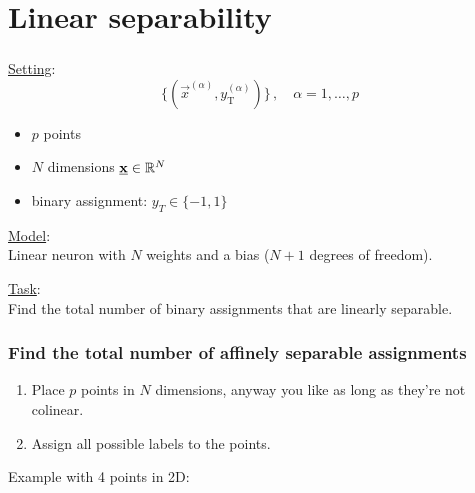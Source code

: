 \section{Linear separability}


\begin{frame}\frametitle{\secname}

\underline{Setting}:\\

\begin{equation*}
\Big\{ \left(\vec x^{(\alpha)}, y^{(\alpha)}_{\mathrm{T}} \right) \Big\}\,,\quad \alpha = 1,\ldots,p
\end{equation*}

\begin{itemize}
\item $p$ points
\item $N$ dimensions $\underline{\mathbf{x}} \in \mathbb{R}^N$
\item binary assignment: $y_T \in \{-1,1\}$
\end{itemize}

\pause

\underline{Model}:\\

Linear neuron with $N$ weights and a bias ($N+1$ degrees of freedom).

\pause

\underline{Task}:\\

Find the total number of binary assignments that are linearly separable.

\end{frame}

\begin{frame}\frametitle{Find the total number of affinely separable assignments}

\begin{enumerate}
\item Place $p$ points in $N$ dimensions, anyway you like as long as they're not colinear.
\item Assign all possible labels to the points.
\end{enumerate}

Example with 4 points in 2D:


\\



\end{frame}

